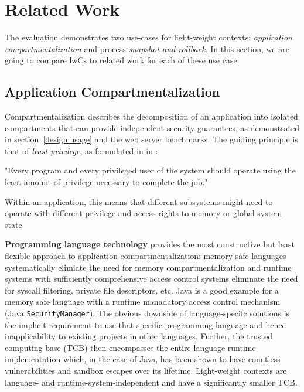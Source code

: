 \documentclass[10pt,twocolumn,letter]{article}
\begin{document}
\section{Related Work}\label{rel}
The evaluation demonstrates two use-cases for light-weight contexts: \textit{application compartmentalization} and process \textit{snapshot-and-rollback}.
In this section, we are going to compare lwCs to related work for each of these use case.

\subsection{Application Compartmentalization}
Compartmentalization describes the decomposition of an application into isolated compartments that can provide independent security guarantees, as demonstrated in section~\ref{design:usage} and the web server benchmarks.
The guiding principle is that of \textit{least privilege}, as formulated in \citeyear{principleofleastprivilege} in \cite{principleofleastprivilege}:
\begin{displayquote}
"Every program and every privileged user of the system should operate using the least amount of privilege necessary to complete the job."
\end{displayquote}
Within an application, this means that different subsystems might need to operate with different privilege and access rights to memory or global system state.

\textbf{Programming language technology} provides the most constructive but least flexible approach to application compartmentalization:
memory safe languages systematically elimiate the need for memory compartmentalization and
runtime systems with sufficiently comprehensive access control systems eliminate the need for syscall filtering, private file descriptors, etc.
Java is a good example for a memory safe language with a runtime manadatory access control mechanism (Java \lstinline{SecurityManager}).
The obvious downside of language-specifc solutions is the implicit requirement to use that specific programming language and hence inapplicability to existing projects in other languages.
Further, the trusted computing base (TCB) then encompasses the entire language runtime implementation which, in the case of Java, has been shown to have countless vulnerabilities and sandbox escapes over its lifetime.
Light-weight contexts are language- and runtime-system-independent and have a significantly smaller TCB.
\cite{javasecurity,bartel2018twentyyearsjavasecuritysandboxescape}
\end{document}
